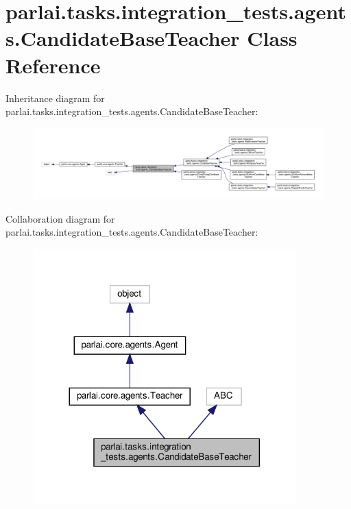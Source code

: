 \hypertarget{classparlai_1_1tasks_1_1integration__tests_1_1agents_1_1CandidateBaseTeacher}{}\section{parlai.\+tasks.\+integration\+\_\+tests.\+agents.\+Candidate\+Base\+Teacher Class Reference}
\label{classparlai_1_1tasks_1_1integration__tests_1_1agents_1_1CandidateBaseTeacher}


Inheritance diagram for parlai.\+tasks.\+integration\+\_\+tests.\+agents.\+Candidate\+Base\+Teacher\+:\nopagebreak
\begin{figure}[H]
\begin{center}
\leavevmode
\includegraphics[width=350pt]{d4/d49/classparlai_1_1tasks_1_1integration__tests_1_1agents_1_1CandidateBaseTeacher__inherit__graph}
\end{center}
\end{figure}


Collaboration diagram for parlai.\+tasks.\+integration\+\_\+tests.\+agents.\+Candidate\+Base\+Teacher\+:\nopagebreak
\begin{figure}[H]
\begin{center}
\leavevmode
\includegraphics[width=288pt]{de/db1/classparlai_1_1tasks_1_1integration__tests_1_1agents_1_1CandidateBaseTeacher__coll__graph}
\end{center}
\end{figure}
